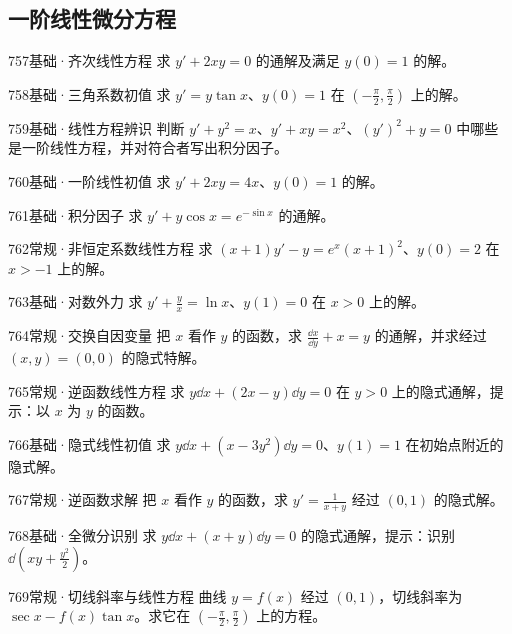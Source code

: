 \subsection{一阶线性微分方程}
\begin{exercise}{757}{基础·齐次线性方程}
求 $y'+2xy=0$ 的通解及满足 $y(0)=1$ 的解。
\end{exercise}
\begin{exercise}{758}{基础·三角系数初值}
求 $y'=y\tan x$、$y(0)=1$ 在 $(-\frac{\pi}{2},\frac{\pi}{2})$ 上的解。
\end{exercise}
\begin{exercise}{759}{基础·线性方程辨识}
判断 $y'+y^2=x$、$y'+xy=x^2$、$(y')^2+y=0$ 中哪些是一阶线性方程，并对符合者写出积分因子。
\end{exercise}
\begin{exercise}{760}{基础·一阶线性初值}
求 $y'+2xy=4x$、$y(0)=1$ 的解。
\end{exercise}
\begin{exercise}{761}{基础·积分因子}
求 $y'+y\cos x=e^{-\sin x}$ 的通解。
\end{exercise}
\begin{exercise}{762}{常规·非恒定系数线性方程}
求 $(x+1)y'-y=e^x(x+1)^2$、$y(0)=2$ 在 $x>-1$ 上的解。
\end{exercise}
\begin{exercise}{763}{基础·对数外力}
求 $y'+\frac{y}{x}=\ln x$、$y(1)=0$ 在 $x>0$ 上的解。
\end{exercise}
\begin{exercise}{764}{常规·交换自因变量}
把 $x$ 看作 $y$ 的函数，求 $\frac{\dd x}{\dd y}+x=y$ 的通解，并求经过 $(x,y)=(0,0)$ 的隐式特解。
\end{exercise}
\begin{exercise}{765}{常规·逆函数线性方程}
求 $y\dd x+(2x-y)\dd y=0$ 在 $y>0$ 上的隐式通解，提示：以 $x$ 为 $y$ 的函数。
\end{exercise}
\begin{exercise}{766}{基础·隐式线性初值}
求 $y\dd x+(x-3y^2)\dd y=0$、$y(1)=1$ 在初始点附近的隐式解。
\end{exercise}
\begin{exercise}{767}{常规·逆函数求解}
把 $x$ 看作 $y$ 的函数，求 $y'=\frac{1}{x+y}$ 经过 $(0,1)$ 的隐式解。
\end{exercise}
\begin{exercise}{768}{基础·全微分识别}
求 $y\dd x+(x+y)\dd y=0$ 的隐式通解，提示：识别 $\dd(xy+\frac{y^2}{2})$。
\end{exercise}
\begin{exercise}{769}{常规·切线斜率与线性方程}
曲线 $y=f(x)$ 经过 $(0,1)$，切线斜率为 $\sec x-f(x)\tan x$。求它在 $(-\frac{\pi}{2},\frac{\pi}{2})$ 上的方程。
\end{exercise}
